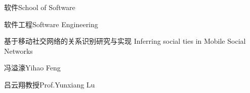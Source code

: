
\school
{软件}{School of Software}

\major
{软件工程}{Software Engineering}

\thesistitle
{基于移动社交网络的关系识别研究与实现}
{}
{Inferring social ties in Mobile Social Networks}
{}

\thesisauthor
{冯溢濠}{Yihao Feng}

\teacher
{吕云翔教授}{Prof.Yunxiang Lu}






